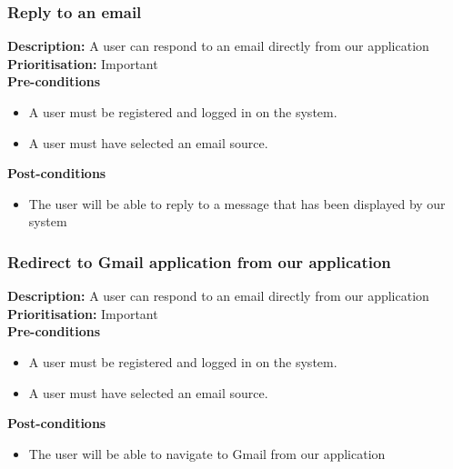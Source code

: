 \documentclass[hidelinks,english]{article}
\begin{document}
    		\subsubsection{Reply to an email}
				\textbf{Description:}  A user can respond to an email directly from our application\\
			    \textbf{Prioritisation:} Important\\
      			\textbf{Pre-conditions}
			    \begin{itemize}
			        \item A user must be registered and logged in on the system.
			        \item A user must have selected an email source.
			    \end{itemize}
    			\textbf{Post-conditions}
			    \begin{itemize}
			    	\item The user will be able to reply to a message that has been displayed by our system
    			\end{itemize}
    			
    		\subsubsection{Redirect to Gmail application from our application}
				\textbf{Description:}  A user can respond to an email directly from our application\\
			    \textbf{Prioritisation:} Important\\
      			\textbf{Pre-conditions}
			    \begin{itemize}
			        \item A user must be registered and logged in on the system.
			        \item A user must have selected an email source.
			    \end{itemize}
    			\textbf{Post-conditions}
			    \begin{itemize}
			    	\item The user will be able to navigate to Gmail from our application
    			\end{itemize}
    			
    	    
\end{document}
